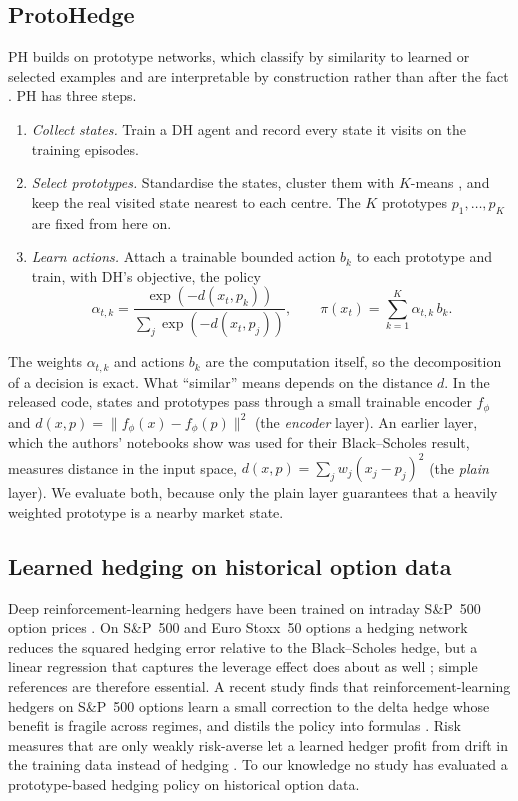 \documentclass[10pt,conference]{IEEEtran}
\begin{document}
\subsection{ProtoHedge}
PH \cite{faloughi2025protohedge} builds on prototype networks, which classify
by similarity to learned or selected examples
\cite{li2018prototypes,chen2019looks} and are interpretable by construction
rather than after the fact \cite{rudin2019stop}. PH has three steps.
\begin{enumerate}
\item \emph{Collect states.} Train a DH agent and record every state it visits
on the training episodes.
\item \emph{Select prototypes.} Standardise the states, cluster them with
$K$-means \cite{macqueen1967}, and keep the real visited state nearest to
each centre. The $K$ prototypes $p_1,\dots,p_K$ are fixed from here on.
\item \emph{Learn actions.} Attach a trainable bounded action $b_k$ to each
prototype and train, with DH's objective, the policy
\begin{equation}
 \alpha_{t,k}=\frac{\exp(-d(x_t,p_k))}{\sum_j \exp(-d(x_t,p_j))},\qquad
 \pi(x_t)=\sum_{k=1}^{K}\alpha_{t,k}\,b_k .
 \label{eq:proto}
\end{equation}
\end{enumerate}
The weights $\alpha_{t,k}$ and actions $b_k$ are the computation itself, so
the decomposition of a decision is exact. What ``similar'' means depends on
the distance $d$. In the released code, states and prototypes pass through a
small trainable encoder $f_\phi$ and
$d(x,p)=\lVert f_\phi(x)-f_\phi(p)\rVert^2$ (the \emph{encoder} layer). An
earlier layer, which the authors' notebooks show was used for their
Black--Scholes result, measures distance in the input space,
$d(x,p)=\sum_j w_j (x_j-p_j)^2$ (the \emph{plain} layer). We evaluate both,
because only the plain layer guarantees that a heavily weighted prototype is
a nearby market state.

\subsection{Learned hedging on historical option data}
Deep reinforcement-learning hedgers have been trained on intraday S\&P~500
option prices \cite{mikkila2023empirical}. On S\&P~500 and Euro Stoxx~50
options a hedging network reduces the squared hedging error relative to the
Black--Scholes hedge, but a linear regression that captures the leverage
effect does about as well \cite{ruf2022hedging}; simple references are
therefore essential. A recent study finds that reinforcement-learning hedgers
on S\&P~500 options learn a small correction to the delta hedge whose benefit
is fragile across regimes, and distils the policy into formulas
\cite{zernikov2026deep}. Risk measures that are only weakly risk-averse let a
learned hedger profit from drift in the training data instead of hedging
\cite{buehler2021drift}. To our knowledge no study has evaluated a
prototype-based hedging policy on historical option data.
\end{document}
